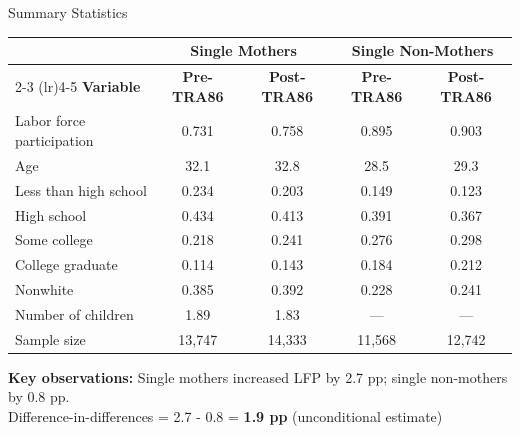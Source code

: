 \documentclass[aspectratio=169]{beamer}
\begin{document}
\begin{frame}{Summary Statistics}
\begin{table}
\centering
\small
\begin{tabular}{lcccc}
\toprule
& \multicolumn{2}{c}{\textbf{Single Mothers}} & \multicolumn{2}{c}{\textbf{Single Non-Mothers}} \\
\cmidrule(lr){2-3} \cmidrule(lr){4-5}
\textbf{Variable} & \textbf{Pre-TRA86} & \textbf{Post-TRA86} & \textbf{Pre-TRA86} & \textbf{Post-TRA86} \\
\midrule
Labor force participation & 0.731 & 0.758 & 0.895 & 0.903 \\
Age & 32.1 & 32.8 & 28.5 & 29.3 \\
Less than high school & 0.234 & 0.203 & 0.149 & 0.123 \\
High school & 0.434 & 0.413 & 0.391 & 0.367 \\
Some college & 0.218 & 0.241 & 0.276 & 0.298 \\
College graduate & 0.114 & 0.143 & 0.184 & 0.212 \\
Nonwhite & 0.385 & 0.392 & 0.228 & 0.241 \\
Number of children & 1.89 & 1.83 & — & — \\
\midrule
Sample size & 13,747 & 14,333 & 11,568 & 12,742 \\
\bottomrule
\end{tabular}
\end{table}

\vspace{0.3cm}
\small
\textbf{Key observations:} Single mothers increased LFP by 2.7 pp; single non-mothers by 0.8 pp. \\
Difference-in-differences = 2.7 - 0.8 = \textbf{1.9 pp} (unconditional estimate)
\end{frame}
\end{document}

